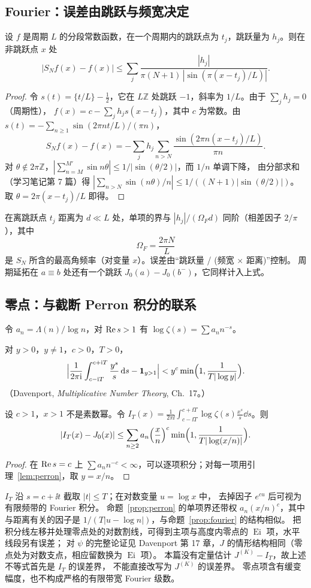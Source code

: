 \documentclass[11pt]{article}
\newcommand{\Ei}{\operatorname{Ei}}
\begin{document}
\subsection{Fourier：误差由跳跃与频宽决定}
\begin{proposition}\label{prop:fourier}
设 $f$ 是周期 $L$ 的分段常数函数，在一个周期内的跳跃点为 $t_j$，跳跃量为 $h_j$。则在非跳跃点 $x$ 处
\[
 |S_Nf(x)-f(x)|\le\sum_j\frac{|h_j|}{\pi(N+1)\,|\sin(\pi(x-t_j)/L)|}.
\]
\end{proposition}
\begin{proof}
令 $s(t)=\{t/L\}-\tfrac12$，它在 $L\mathbb Z$ 处跳跃 $-1$，斜率为 $1/L$。由于 $\sum_jh_j=0$（周期性），
$f(x)=c-\sum_jh_js(x-t_j)$，其中 $c$ 为常数。由 $s(t)=-\sum_{n\ge1}\sin(2\pi nt/L)/(\pi n)$，
\[
 S_Nf(x)-f(x)=-\sum_jh_j\sum_{n>N}\frac{\sin(2\pi n(x-t_j)/L)}{\pi n}.
\]
对 $\theta\notin2\pi\mathbb Z$，$|\sum_{n=M}^{M'}\sin n\theta|\le1/|\sin(\theta/2)|$，而 $1/n$ 单调下降，
由分部求和（学习笔记第 7 篇）得 $|\sum_{n>N}\sin(n\theta)/n|\le1/((N+1)|\sin(\theta/2)|)$。
取 $\theta=2\pi(x-t_j)/L$ 即得。
\end{proof}
在离跳跃点 $t_j$ 距离为 $d\ll L$ 处，单项的界与 $|h_j|/(\Omega_Fd)$ 同阶（相差因子 $2/\pi$），其中
\[
 \Omega_F=\frac{2\pi N}L
\]
是 $S_N$ 所含的最高角频率（对变量 $x$）。误差由“跳跃量 / (频宽 $\times$ 距离)”控制。
周期延拓在 $a\equiv b$ 处还有一个跳跃 $J_0(a)-J_0(b^-)$，它同样计入上式。

\subsection{零点：与截断 Perron 积分的联系}
令 $a_n=\Lambda(n)/\log n$，对 $\operatorname{Re} s>1$ 有 $\log\zeta(s)=\sum a_nn^{-s}$。
\begin{lemma}[截断 Perron 公式，引用]\label{lem:perron}
对 $y>0$，$y\ne1$，$c>0$，$T>0$，
\[
 \Bigl|\frac1{2\pi\mathrm i}\int_{c-\mathrm i T}^{c+\mathrm i T}\frac{y^s}s\,\mathrm d s-\mathbf 1_{y>1}\Bigr|<y^c\min\Bigl(1,\frac1{T|\log y|}\Bigr).
\]
（Davenport, \emph{Multiplicative Number Theory}, Ch.~17。）
\end{lemma}
\begin{proposition}\label{prop:perron}
设 $c>1$，$x>1$ 不是素数幂。令 $I_T(x)=\frac1{2\pi\ii}\int_{c-\ii T}^{c+\ii T}\log\zeta(s)\frac{x^s}s\dd s$。则
\[
 |I_T(x)-J_0(x)|\le\sum_{n\ge2}a_n\Bigl(\frac xn\Bigr)^c\min\Bigl(1,\frac1{T|\log(x/n)|}\Bigr).
\]
\end{proposition}
\begin{proof}
在 $\operatorname{Re} s=c$ 上 $\sum a_nn^{-c}<\infty$，可以逐项积分；对每一项用引理~\ref{lem:perron}，取 $y=x/n$。
\end{proof}
$I_T$ 沿 $s=c+\ii t$ 截取 $|t|\le T$；在对数变量 $u=\log x$ 中，
去掉因子 $e^{cu}$ 后可视为有限频带的 Fourier 积分。
命题~\ref{prop:perron} 的单项界还带权 $a_n(x/n)^c$，其中与距离有关的因子是
$1/(T|u-\log n|)$，与命题~\ref{prop:fourier} 的结构相似。
把积分线左移并处理零点处的对数割线，可得到主项与高度内零点的 $\Ei$ 项，水平线段另有误差；
对 $\psi$ 的完整论证见 Davenport 第 17 章，$J$ 的情形结构相同（零点处为对数支点，相应留数换为 $\Ei$ 项）。
本篇没有定量估计 $J^{(K)}-I_T$，故上述不等式首先是 $I_T$ 的误差界，
不能直接改写为 $J^{(K)}$ 的误差界。
零点项含有缓变幅度，也不构成严格的有限带宽 Fourier 级数。
\end{document}
